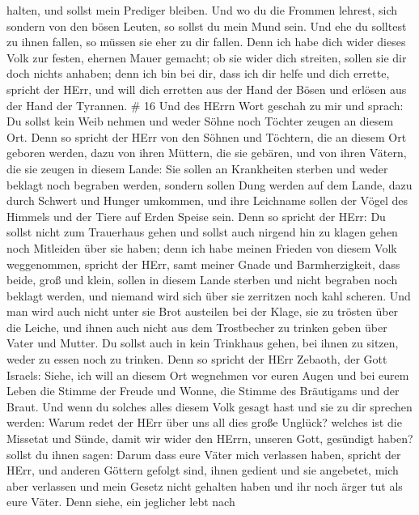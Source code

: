 halten, und sollst mein Prediger bleiben. Und wo du die Frommen lehrest,
sich sondern von den bösen Leuten, so sollst du mein Mund sein. Und ehe
du solltest zu ihnen fallen, so müssen sie eher zu dir fallen.
 Denn ich habe dich wider dieses Volk zur festen, ehernen
Mauer gemacht; ob sie wider dich streiten, sollen sie dir doch nichts
anhaben; denn ich bin bei dir, dass ich dir helfe und dich errette,
spricht der HErr,  und will dich erretten aus der Hand der
Bösen und erlösen aus der Hand der Tyrannen. \# 16  Und des
HErrn Wort geschah zu mir und sprach:  Du sollst kein Weib
nehmen und weder Söhne noch Töchter zeugen an diesem Ort. 
Denn so spricht der HErr von den Söhnen und Töchtern, die an diesem Ort
geboren werden, dazu von ihren Müttern, die sie gebären, und von ihren
Vätern, die sie zeugen in diesem Lande:  Sie sollen an
Krankheiten sterben und weder beklagt noch begraben werden, sondern
sollen Dung werden auf dem Lande, dazu durch Schwert und Hunger
umkommen, und ihre Leichname sollen der Vögel des Himmels und der Tiere
auf Erden Speise sein.  Denn so spricht der HErr: Du sollst
nicht zum Trauerhaus gehen und sollst auch nirgend hin zu klagen gehen
noch Mitleiden über sie haben; denn ich habe meinen Frieden von diesem
Volk weggenommen, spricht der HErr, samt meiner Gnade und
Barmherzigkeit,  dass beide, groß und klein, sollen in
diesem Lande sterben und nicht begraben noch beklagt werden, und niemand
wird sich über sie zerritzen noch kahl scheren.  Und man
wird auch nicht unter sie Brot austeilen bei der Klage, sie zu trösten
über die Leiche, und ihnen auch nicht aus dem Trostbecher zu trinken
geben über Vater und Mutter.  Du sollst auch in kein
Trinkhaus gehen, bei ihnen zu sitzen, weder zu essen noch zu trinken.
 Denn so spricht der HErr Zebaoth, der Gott Israels: Siehe,
ich will an diesem Ort wegnehmen vor euren Augen und bei eurem Leben die
Stimme der Freude und Wonne, die Stimme des Bräutigams und der Braut.
 Und wenn du solches alles diesem Volk gesagt hast und sie
zu dir sprechen werden: Warum redet der HErr über uns all dies große
Unglück? welches ist die Missetat und Sünde, damit wir wider den HErrn,
unseren Gott, gesündigt haben?  sollst du ihnen sagen:
Darum dass eure Väter mich verlassen haben, spricht der HErr, und
anderen Göttern gefolgt sind, ihnen gedient und sie angebetet, mich aber
verlassen und mein Gesetz nicht gehalten haben  und ihr
noch ärger tut als eure Väter. Denn siehe, ein jeglicher lebt nach
